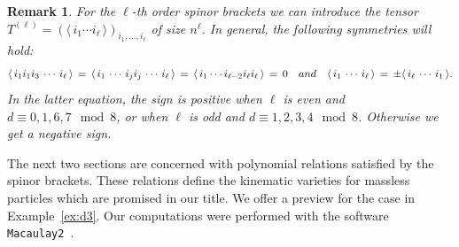 \documentclass[english]{ourlematema}
\numberwithin{theorem}{section}
\newtheorem{remark}[theorem]{Remark}
\theoremstyle{definition}
\begin{document}
\begin{remark}
For the $\ell$-th order spinor brackets we can introduce the
   tensor $T^{(\ell)} = (\langle \, i_1 \cdots i_\ell \, \rangle)_{i_1, \dots, i_\ell}$ of size $n^\ell$. 
   In general, the following symmetries will hold: 
$$
\langle \, i_1 i_1 i_3 \,\cdots\, i_{\ell}\, \rangle \,=\, \langle\, i_1 \,\cdots\, i_j i_j\, \cdots\, i_{\ell}\, \rangle
\, =\, \langle\, i_1 \cdots i_{\ell - 2} i_{\ell} i_{\ell}\, \rangle \,=\, 0
\quad {\rm and} \quad \langle \, i_1\, \cdots \,i_\ell \, \rangle \,=\, \pm\langle \, i_\ell\, \cdots \,i_1 \, \rangle.
$$
In the latter equation,  the sign is positive when $\ell$ is even
and $d \equiv 0,1,6,7 \!\!\! \mod{8}$, or when  $\ell$ is odd
and $d \equiv 1,2,3,4 \!\!\! \mod{8}$. Otherwise we get a negative sign.
\end{remark}

The next two sections are concerned with
polynomial relations satisfied by the spinor brackets.
These relations define the kinematic varieties for massless particles
which are promised in our title.
We offer a preview for the case in Example~\ref{ex:d3}.
Our computations were performed with
the software  {\tt Macaulay2}~\cite{M2}.
\end{document}
